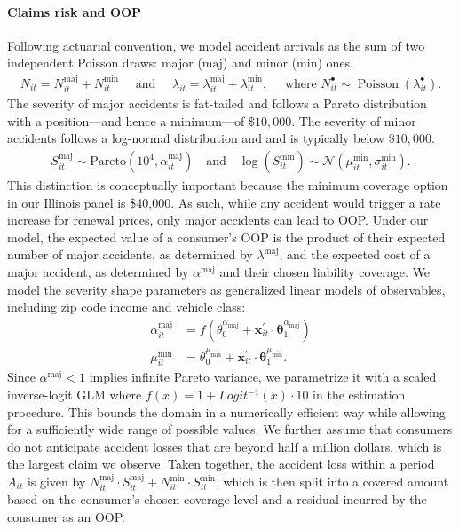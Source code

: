 \paragraph{Claims risk and OOP}
Following actuarial convention, we model accident arrivals as the sum of two independent Poisson draws: major ($\mathrm{maj}$) and minor ($\mathrm{min}$) ones.
\begin{equation}\label{eq-claim-occurrence-model}
\begin{aligned}
N_{it}  = N_{it}^{\mathrm{maj}} + N_{it}^{\mathrm{min}}
\quad\text{ and }\quad
\lambda_{it} = \lambda_{it}^{\mathrm{maj}} + \lambda_{it}^{\mathrm{min}},
\quad
\text{ where } N^{\bullet}_{it} \sim \operatorname{Poisson}(\lambda^{\bullet}_{it}).
\end{aligned}
\end{equation}
The severity of major accidents is fat-tailed and follows a Pareto distribution with a position---and hence a minimum---of $\$10,000$. The severity of minor accidents follows a log-normal distribution and and is typically below $\$10,000$.
\begin{align}\label{eq-claim-severity-model}
    S_{it}^{\mathrm{maj}}  \sim \text{Pareto}(10^4, \alpha^{\mathrm{maj}}_{it}) \quad \text{and} \quad \log(S^{\mathrm{min}}_{it}) \sim \mathcal{N}(\mu^{\mathrm{min}}_{it}, \sigma^{\mathrm{min}}_{it}).
\end{align}
This distinction is conceptually important because the minimum coverage option in our Illinois panel is \$40,000. As such, while any accident would trigger a rate increase for renewal prices, only major accidents can lead to OOP. Under our model, the expected value of a consumer's OOP is the product of their expected number of major accidents, as determined by $\lambda^{\mathrm{maj}}$, and the expected cost of a major accident, as determined by $\alpha^{\mathrm{maj}}$ and their chosen liability coverage. We model the severity shape parameters as generalized linear models of observables, including zip code income and vehicle class:
\begin{align}\label{eq-claim-severity-hyper-params}
     \alpha_{it}^{\mathrm{maj}} & = f(\theta^{\alpha_\text{maj}}_0 + \mathbf{x}_{it}^\prime \cdot \mathbf{\theta}^{\alpha_\text{maj}}_{1}) \\
     \mu_{it}^{\mathrm{min}} & =  \theta^{\mu_\text{min}}_0 + \mathbf{x}_{it}^\prime \cdot \mathbf{\theta}^{\mu_\text{min}}_{1}.
\end{align}
Since $\alpha^{\mathrm{maj}}<1$ implies infinite Pareto variance, we parametrize it with a scaled inverse-logit GLM where $f(x) = 1 + Logit^{-1}(x) \cdot 10$ in the estimation procedure. This bounds the domain in a numerically efficient way while allowing for a sufficiently wide range of possible values. We further assume that consumers do not anticipate accident losses that are beyond half a million dollars, which is the largest claim we observe. Taken together, the accident loss within a period $A_{it}$ is given by $N_{it}^{\mathrm{maj}}\cdot S_{it}^{\mathrm{maj}} + N_{it}^{\mathrm{min}} \cdot S_{it}^{\mathrm{min}}$, which is then split into a covered amount based on the consumer's chosen coverage level and a residual incurred by the consumer as an OOP.

